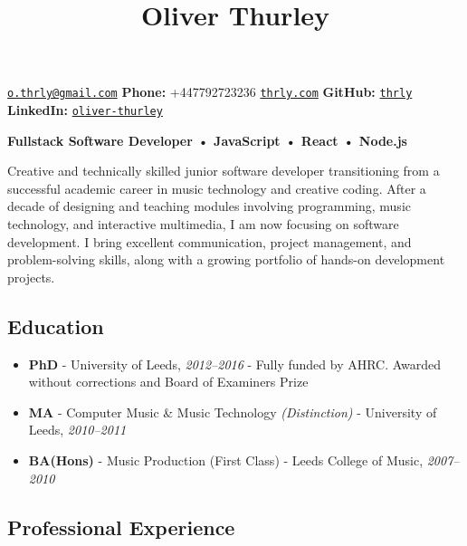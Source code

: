 \documentclass[11pt,a4paper]{article}
\title{\textcolor{devblue}{\large Oliver Thurley}}
\author{}
\date{}
\providecommand{\tightlist}{%
  \setlength{\itemsep}{0pt}\setlength{\parskip}{0pt}}
\begin{document}
\maketitle

\vspace{-1em}
\noindent\href{mailto:o.thrly@gmail.com}{\texttt{o.thrly@gmail.com}} \hspace{1em}
\textbf{Phone:} +447792723236 \hspace{1em}
\href{https://thrly.com}{\texttt{thrly.com}} \hspace{1em}
\textbf{GitHub:} \href{https://github.com/thrly}{\texttt{thrly}} \hspace{1em}
\textbf{LinkedIn:} \href{https://linkedin.com/in/oliver-thurley}{\texttt{oliver-thurley}}

\vspace{1em}

\textbf{Fullstack Software Developer • JavaScript • React • Node.js}

Creative and technically skilled junior software developer transitioning
from a successful academic career in music technology and creative
coding. After a decade of designing and teaching modules involving
programming, music technology, and interactive multimedia, I am now
focusing on software development. I bring excellent communication,
project management, and problem-solving skills, along with a growing
portfolio of hands-on development projects.

\subsection{Education}\label{education}

\begin{itemize}
\tightlist
\item
  \textbf{PhD} - University of Leeds, \emph{2012--2016} - Fully funded
  by AHRC. Awarded without corrections and Board of Examiners Prize
\item
  \textbf{MA} - Computer Music \& Music Technology \emph{(Distinction)}
  - University of Leeds, \emph{2010--2011}
\item
  \textbf{BA(Hons)} - Music Production (First Class) - Leeds College of
  Music, \emph{2007--2010}
\end{itemize}

\subsection{Professional Experience}\label{professional-experience}
\end{document}

